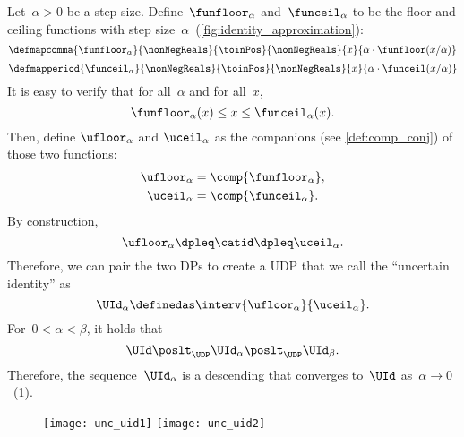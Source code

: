 Let~$\alpha>0$ be a step size.
Define~$\funfloor_{\alpha}$ and~$\funceil_{\alpha}$ to be the floor and ceiling functions with step size~$\alpha$~(\cref{fig:identity_approximation}):
\begin{equation}
    \defmapcomma{
        \funfloor_{\alpha}
    }{
        \nonNegReals
    }{
        \toinPos
    }{
        \nonNegReals
    }{
        x
    }{
        \alpha \cdot \funfloor(x/\alpha)
    }
\end{equation}
\begin{equation}
    \defmapperiod{
        \funceil_{\alpha}
    }{
        \nonNegReals
    }{
        \toinPos
    }{
        \nonNegReals
    }{
        x
    }{
        \alpha \cdot \funceil(x/\alpha)
    }
\end{equation}
It is easy to verify that for all~$\alpha$ and for all~$x$,
\begin{equation}
    \funfloor_{\alpha}(x) \leq x \leq \funceil_{\alpha}(x).
\end{equation}
Then, define $\ufloor_{\alpha}$ and $\uceil_\alpha$ as the companions (see \cref{def:comp_conj}) of those two functions:
\begin{align}
    \ufloor_{\alpha} & = \comp{\funfloor_\alpha}, \\
    \uceil_{\alpha}  & = \comp{\funceil_\alpha} .
\end{align}
By construction,
\begin{equation}
    \ufloor_{\alpha}\dpleq\catid\dpleq\uceil_{\alpha}.
\end{equation}
Therefore, we can pair the two DPs to create a UDP that we call the ``uncertain identity'' as
\begin{equation}
    \UId_{\alpha}\definedas \interv {\ufloor_{\alpha}} {\uceil_{\alpha}}.
\end{equation}
For~$0<\alpha<\beta$, it holds that
%
\begin{equation}
    \UId\poslt_{\UDP}\UId_{\alpha}\poslt_{\UDP}\UId_{\beta}.
\end{equation}
%
Therefore, the sequence~$\UId_{\alpha}$ is a descending   that converges to~$\UId$ as~$\alpha\to0$~(\cref{fig:other}).

\begin{figure}[b]
    \hfill
    \texttt{[image: unc\_uid1]}
    \hfill
    \texttt{[image: unc\_uid2]}
    \hfill
    \caption{}
    \label{fig:other}
\end{figure}

